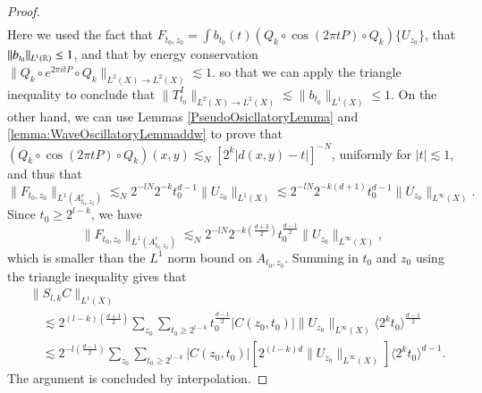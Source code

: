 \begin{proof}
\begin{align*}
    \end{align*}
    Here we used the fact that $F_{t_0,z_0} = \int b_{t_0}(t) ( Q_k \circ \cos(2 \pi t P) \circ Q_k ) \{ U_{z_0} \}$, that $\| b_{t_0} \|_{L^1(\operatorname{\mathbb{R}})} \leq 1$,  and that by energy conservation $\| Q_k \circ e^{2 \pi i t P} \circ Q_k \|_{L^2(X) \to L^2(X)} \lesssim 1$. so that we can apply the triangle inequality to conclude that $\| T_{t_0}^I \|_{L^2(X) \to L^2(X)} \lesssim \| b_{t_0} \|_{L^1(X)} \leq 1$. On the other hand, we can use Lemmas \ref{PseudoOsicllatoryLemma} and \ref{lemma:WaveOscillatoryLemmaddw} to prove that $(Q_k \circ \cos(2 \pi t P) \circ Q_k)(x,y) \lesssim_N [2^k |d(x,y) - t|]^{-N}$, uniformly for $|t| \lesssim 1$, and thus that
    \[ \| F_{t_0,z_0} \|_{L^1(A_{t_0,z_0}^c)} \lesssim_N 2^{-lN} 2^{-k} t_0^{d-1} \| U_{z_0} \|_{L^1(X)} \lesssim 2^{-lN} 2^{-k(d+1)} t_0^{d-1} \| U_{z_0} \|_{L^\infty(X)}. \]
    Since $t_0 \geq 2^{l-k}$, we have
    \[ \| F_{t_0,z_0} \|_{L^1(A_{t_0,z_0}^c)} \lesssim_N 2^{-lN} 2^{-k \left( \frac{d+3}{2} \right)} t_0^{\frac{d-1}{2}} \| U_{z_0} \|_{L^\infty(X)}, \]
    which is smaller than the $L^1$ norm bound on $A_{t_0,z_0}$.
    Summing in $t_0$ and $z_0$ using the triangle inequality gives that
    \begin{align*}
        &\| S_{l,k} C \|_{L^1(X)}\\
        &\quad \lesssim 2^{(l-k) \left( \frac{d+1}{2}\right)} \sum\nolimits_{z_0} \sum\nolimits_{t_0 \geq 2^{l-k}} t_0^{\frac{d-1}{2}} |C(z_0,t_0)| \| U_{z_0} \|_{L^\infty(X)} \langle 2^k t_0 \rangle^{\frac{d-1}{2}}\\
        &\quad \lesssim 2^{-l \left( \frac{d-1}{2} \right)} \sum\nolimits_{z_0} \sum\nolimits_{t_0 \geq 2^{l-k}} |C(z_0,t_0)| \left[  2^{(l-k)d} \| U_{z_0} \|_{L^\infty(X)}\right] \langle 2^k t_0 \rangle^{d-1}.
    \end{align*}
    The argument is concluded by interpolation.
\end{proof}

